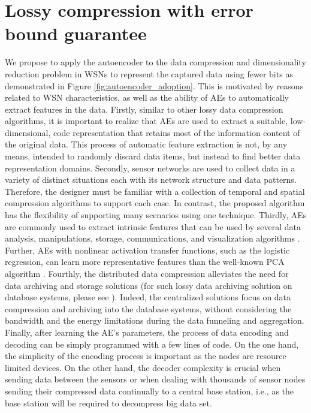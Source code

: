\documentclass[a4paper,onecolumn,conference]{IEEEtran}
\begin{document}
\vspace{-2mm}
\section{Lossy compression with error bound guarantee}\label{sec:framework}

We propose to apply the autoencoder to the data compression and dimensionality reduction problem in WSNs to represent the captured data using fewer bits as demonstrated in Figure \ref{fig:autoencoder_adoption}. This is motivated by reasons related to WSN characteristics, as well as the ability of AEs to automatically extract features in the data. Firstly, similar to other lossy data compression algorithms, it is important to realize that AEs are used to extract a suitable, low-dimensional, code representation that retains most of the information content of the original data. This process of automatic feature extraction is not, by any means, intended to randomly discard data items, but instead to find better data representation domains. Secondly, sensor networks are used to collect data in a variety of distinct situations each with its network structure and data patterns. Therefore, the designer must be familiar with a collection of temporal and spatial compression algorithms to support each case. In contrast, the proposed algorithm has the flexibility of supporting many scenarios using one technique. Thirdly, AEs are commonly used to extract intrinsic features that can be used by several data analysis, manipulations, storage, communications, and visualization algorithms \cite{hinton2006reducing}. Further, AEs with nonlinear activation transfer functions, such as the logistic regression, can learn more representative features than the well-known PCA algorithm \cite{japkowicz2000nonlinear}. Fourthly, the distributed data compression alleviates the need for data archiving and storage solutions (for such lossy data archiving solution on database systems, please see \cite{gandhi2009gamps}).
Indeed, the centralized solutions focus on data compression and archiving into the database systems, without considering the bandwidth and the energy limitations during the data funneling and aggregation. Finally, after learning the AE's parameters, the process of data encoding and decoding can be simply programmed with a few lines of code. On the one hand, the simplicity of the encoding process is important as the nodes are resource limited devices. On the other hand, the decoder complexity is crucial when sending data between the sensors or when dealing with thousands of sensor nodes sending their compressed
data continually to a central base station, i.e., as the base station will be required to decompress big data set.
\end{document}
